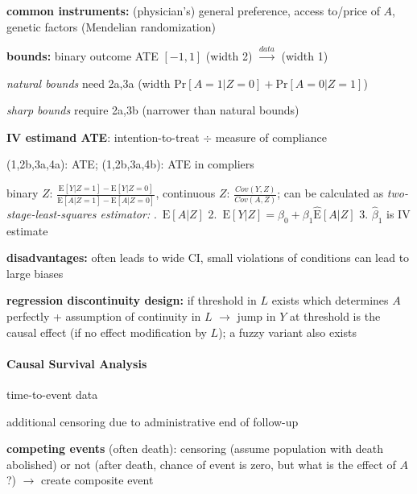 \documentclass[8pt,twoside]{extarticle}
\begin{document}
\begin{multicols}{2}
\noindent \textbf{common instruments:} (physician's) general preference, access to/price of $A$, genetic factors (Mendelian randomization)

\noindent \textbf{bounds:} binary outcome ATE $\left[-1,1\right]$ (width 2)  $\overset{data}{\rightarrow}$ (width 1)

\noindent \textit{natural bounds} need 2a,3a  (width $\mathrm{Pr}\left[A{=}1|Z{=}0\right] + \mathrm{Pr}\left[A{=}0|Z{=}1\right]$)

\noindent \textit{sharp bounds} require 2a,3b (narrower than natural bounds)


\noindent \textbf{IV estimand ATE}: intention-to-treat $\div$ measure of compliance

\noindent (1,2b,3a,4a):  ATE;
  (1,2b,3a,4b): ATE in compliers

\noindent binary $Z$: $\frac{\mathrm{E}\left[Y|Z=1\right] - \mathrm{E}\left[Y|Z=0\right]}{\mathrm{E}\left[A|Z=1\right] - \mathrm{E}\left[A|Z=0\right]}$, continuous $Z$: $\frac{Cov(Y,Z)}{Cov(A,Z)}$; \newline can be calculated as \textit{two-stage-least-squares estimator:} .\ $\mathrm{E}\left[A|Z\right]$ 2.\ $\mathrm{E}\left[Y|Z\right] = \beta_0 + \beta_1\hat{\mathrm{E}}\left[A|Z\right]$ 3. $\hat{\beta}_1$ is IV estimate

\noindent \textbf{disadvantages:} often leads to wide CI, small violations of conditions can lead to large biases

\noindent \textbf{regression discontinuity design:} if threshold in $L$ exists which determines $A$ perfectly + assumption of continuity in $L$ $\to$ jump in $Y$ at threshold is the causal effect (if no effect modification by $L$); a fuzzy variant also exists
\citep{hernan2023causal}



\paragraph{Causal Survival Analysis} time-to-event data

\noindent additional censoring due to administrative end of follow-up

\noindent \textbf{competing events} (often death): censoring (assume population with death abolished) or not (after death, chance of event is zero, but what is the effect of $A$?) $\rightarrow$ create composite event


\end{multicols}
\end{document}

